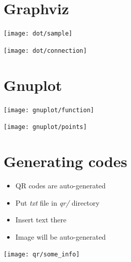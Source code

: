 \section{Graphviz}


{
\vspace{-1em}
\begin{center}
\texttt{[image: dot/sample]}
\end{center}
}


{
\vspace{-1em}
\begin{center}
\texttt{[image: dot/connection]}
\end{center}
}


\section{Gnuplot}


{
\begin{center}
\texttt{[image: gnuplot/function]}
\end{center}
}


{
\begin{center}
\texttt{[image: gnuplot/points]}
\end{center}
}


\section{Generating codes}


{
\begin{itemize}
\item QR codes are auto-generated
\item Put \emph{txt} file in \emph{qr/} directory
\item Insert text there
\item Image will be auto-generated
\end{itemize}

\begin{center}
\texttt{[image: qr/some\_info]}
\end{center}
}
